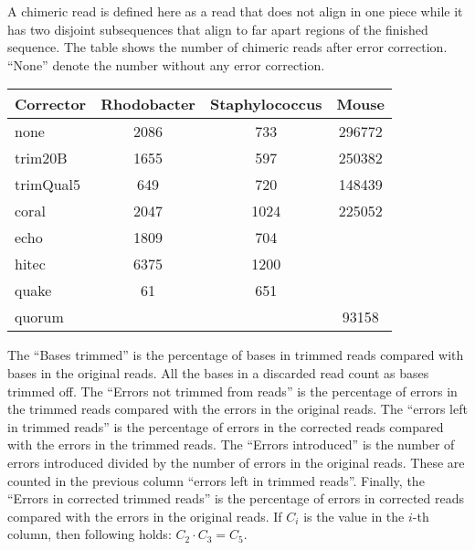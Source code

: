 \documentclass[10pt]{bmc_article}
\newenvironment{bmcformat}{\fussy\setboolean{publ}{true}}{\fussy}
\begin{document}
\begin{bmcformat}
%
%

\label{table:chimeric}

A chimeric read is defined here as a read that does not align in one piece while it has two disjoint subsequences that align to far apart regions of the finished sequence. 
The table shows the number of chimeric reads after error correction.
``None'' denote the number without any error correction.

\bigskip

\begin{tabular}{@{}lS[detect-weight,table-format=4]S[detect-weight,table-format=4]S[detect-weight,table-format=6]@{}}
\toprule
{Corrector} & {Rhodobacter} & {Staphylococcus} & {Mouse}        \\
\midrule                                                       
none        & 2086          & 733              & 296772         \\
trim20B     & 1655          & 597              & 250382         \\
trimQual5   & 649           & 720              & 148439         \\
coral       & 2047          & 1024             & 225052         \\
echo        & 1809          & 704              &                \\
hitec       & 6375          & 1200             &                \\
quake       & 61            & 651              &  \\
quorum      &    &       & 93158          \\
\bottomrule
\end{tabular}

%
%
\label{table:left-introduced}

The ``Bases trimmed'' is the percentage of bases in trimmed reads compared with bases in the original reads.
All the bases in a discarded read count as bases trimmed off.
The ``Errors not trimmed from reads'' is the percentage of errors in the trimmed reads compared with the errors in the original reads.
The ``errors left in trimmed reads'' is the percentage of errors in the corrected reads compared with the errors in the trimmed reads.
The ``Errors introduced'' is the number of errors introduced divided by the number of errors in the original reads.
These are counted in the previous column ``errors left in trimmed reads''.
Finally, the ``Errors in corrected trimmed reads'' is the percentage of errors in corrected reads compared with the errors in the original reads.
If $C_i$ is the value in the $i$-th column, then following holds: $C_2 \cdot C_3 = C_5$.


\end{bmcformat}
\end{document}

